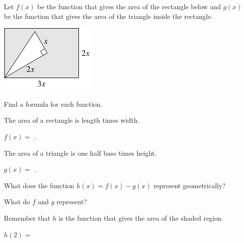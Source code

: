 \documentclass{ximera}
\begin{document}
\begin{question}
Let $f(x)$ be the function that gives the area of the rectangle below and $g(x)$ be the function that gives the area of the triangle inside the rectangle. 
\begin{image}
\includegraphics{ShadedArea.png}
\end{image}

Find a formula for each function.

\begin{hint}
The area of a rectangle is length times width.
\end{hint}
\begin{prompt}
$f(x)=$ .
\end{prompt}

\begin{hint}
The area of a triangle is one half base times height.
\end{hint}
\begin{prompt}
$g(x)=$ .
\end{prompt}

What does the function $h(x)=f(x)-g(x)$ represent geometrically?
\begin{hint}
What do $f$ and $g$ represent? 
\end{hint}
\begin{multipleChoice}
\end{multipleChoice}

\begin{hint}
Remember that $h$ is the function that gives the area of the shaded region. 
\end{hint}
\begin{prompt}
$h(2)=$ 
\end{prompt}
\end{question}
\end{document}
